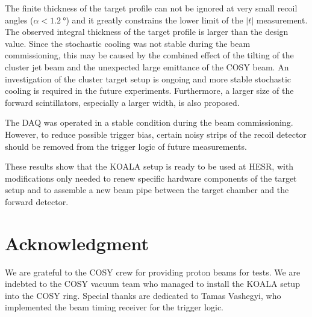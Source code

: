 \documentclass[number,5p]{elsarticle}
\begin{document}
The finite thickness of the target profile can not be ignored at
very small recoil angles ($\alpha < \SI{1.2}{\degree}$) and it greatly
constrains the lower limit of the $|t|$ measurement.
The observed integral thickness of the target profile is larger than the design value.
Since the stochastic cooling was not stable during the beam commissioning, this may be caused by the combined effect of the tilting of the cluster jet
beam and the unexpected large emittance of the COSY beam.
An investigation of the cluster target setup is ongoing and more stable stochastic cooling is required in the future experiments.
Furthermore, a larger size of the forward scintillators, especially a larger width, is also proposed.

The DAQ was operated in a stable condition during the beam commissioning.
However, to reduce possible trigger bias, certain noisy strips of the recoil
detector should be removed from the trigger logic of future measurements.


These results show that the KOALA setup is ready to be used at HESR, with modifications only needed
to renew specific hardware components of the target setup and to assemble a new
beam pipe between the target chamber and the forward detector. 

\section{Acknowledgment}
\label{sec:acknowledgement}
We are grateful to the COSY crew for providing proton beams for tests.
We are indebted to the COSY vacuum team who managed to install the KOALA
setup into the COSY ring. Special thanks are dedicated to Tamas
Vashegyi, who implemented the beam timing receiver for the trigger logic.



\end{document}
